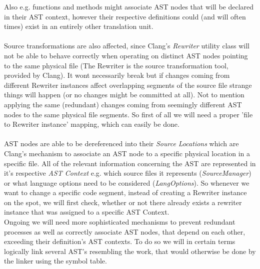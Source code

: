 Also e.g. functions and methods might associate AST nodes that will be declared in their AST context, however their respective definitions could (and will often times) exist in an entirely other translation unit.\\\\
Source transformations are also affected, since Clang's \textit{Rewriter} utility class will not be able to behave correctly when operating on distinct AST nodes pointing to the same physical file (The Rewriter is the source transformation tool, provided by Clang). It wont necessarily break but if changes coming from different Rewriter instances affect overlapping segments of the source file strange things will happen (or no changes might be committed at all). Not to mention applying the same (redundant) changes coming from seemingly different AST nodes to the same physical file segments. So first of all we will need a proper 'file to Rewriter instance' mapping, which can easily be done.\\\\
AST nodes are able to be dereferenced into their \textit{Source Locations} which are Clang's mechanism to associate an AST node to a specific physical location in a specific file. All of the relevant information concerning the AST are represented in it's respective \textit{AST Context} e.g. which source files it represents (\textit{SourceManager}) or what language options need to be considered (\textit{LangOptions}). So whenever we want to change a specific code segment, instead of creating a Rewriter instance on the spot, we will first check, whether or not there already exists a rewriter instance that was assigned to a specific AST Context.\\
Ongoing we will need more sophisticated mechanisms to prevent redundant processes as well as correctly associate AST nodes, that depend on each other, exceeding their definition's AST contexts. To do so we will in certain terms logically link several AST's resembling the work, that would otherwise be done by the linker using the symbol table.

